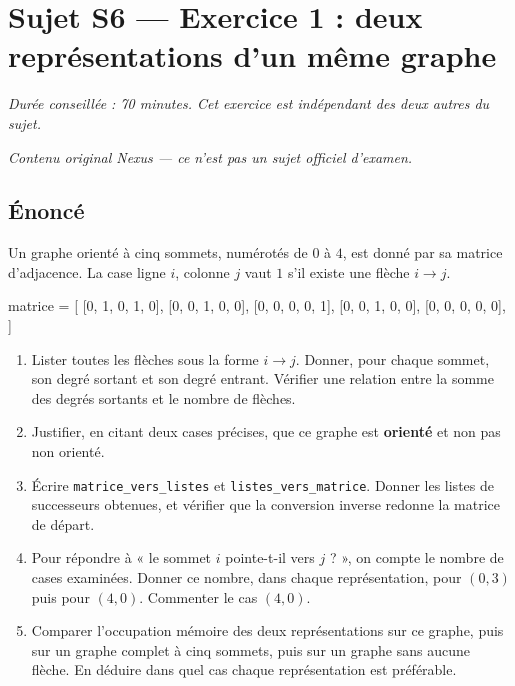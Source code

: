 \section*{Sujet S6 --- Exercice 1 : deux représentations d'un même graphe}

\textit{Durée conseillée : 70 minutes. Cet exercice est indépendant des deux
autres du sujet.}

\medskip
\textit{Contenu original Nexus --- ce n'est pas un sujet officiel d'examen.}

\subsection*{Énoncé}

Un graphe orienté à cinq sommets, numérotés de $0$ à $4$, est donné par sa
matrice d'adjacence. La case ligne $i$, colonne $j$ vaut $1$ s'il existe une
flèche $i \rightarrow j$.

\begin{python}
matrice = [
    [0, 1, 0, 1, 0],
    [0, 0, 1, 0, 0],
    [0, 0, 0, 0, 1],
    [0, 0, 1, 0, 0],
    [0, 0, 0, 0, 0],
]
\end{python}

\begin{enumerate}
  \item Lister toutes les flèches sous la forme $i \rightarrow j$. Donner, pour
    chaque sommet, son degré sortant et son degré entrant. Vérifier une relation
    entre la somme des degrés sortants et le nombre de flèches.

  \item Justifier, en citant deux cases précises, que ce graphe est
    \textbf{orienté} et non pas non orienté.

  \item Écrire \lstinline{matrice_vers_listes} et \lstinline{listes_vers_matrice}.
    Donner les listes de successeurs obtenues, et vérifier que la conversion
    inverse redonne la matrice de départ.

  \item Pour répondre à « le sommet $i$ pointe-t-il vers $j$ ? », on compte le
    nombre de cases examinées. Donner ce nombre, dans chaque représentation,
    pour $(0, 3)$ puis pour $(4, 0)$. Commenter le cas $(4, 0)$.

  \item Comparer l'occupation mémoire des deux représentations sur ce graphe,
    puis sur un graphe complet à cinq sommets, puis sur un graphe sans aucune
    flèche. En déduire dans quel cas chaque représentation est préférable.
\end{enumerate}

